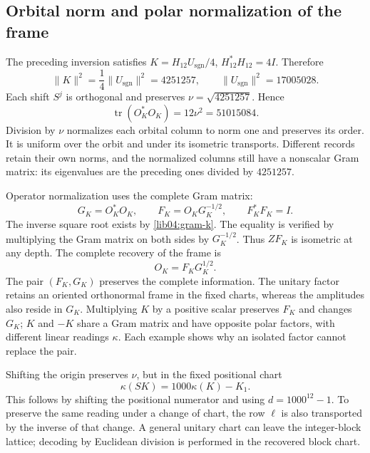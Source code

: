 \subsection{Orbital norm and polar normalization of the frame}
\label{lib04:normalizacion}

The preceding inversion satisfies
\(K=H_{12}U_{\mathrm{sgn}}/4\),
\(H_{12}^*H_{12}=4I\). Therefore
\begin{equation}
 \|K\|^2=\frac14\|U_{\mathrm{sgn}}\|^2=4251257,
 \qquad \|U_{\mathrm{sgn}}\|^2=17005028.
 \label{lib04:norma-k}
\end{equation}
Each shift \(S^j\) is orthogonal and preserves
\(\nu=\sqrt{4251257}\). Hence
\begin{equation}
 \operatorname{tr}(O_K^*O_K)=12\nu^2=51015084.
 \label{lib04:traza-marco}
\end{equation}
Division by \(\nu\) normalizes each orbital column to norm
one and preserves its order. It is uniform over the orbit and under its
isometric transports. Different records retain their own
norms, and the normalized columns still have a nonscalar
Gram matrix: its eigenvalues are the preceding ones divided by
\(4251257\).

Operator normalization uses the complete Gram matrix:
\begin{equation}
 G_K=O_K^*O_K,\qquad
 F_K=O_KG_K^{-1/2},\qquad
 F_K^*F_K=I.
 \label{lib04:polar}
\end{equation}
The inverse square root exists by \eqref{lib04:gram-k}. The equality is
verified by multiplying the Gram matrix on both sides by \(G_K^{-1/2}\).
Thus \(ZF_K\) is isometric at any depth.
The complete recovery of the frame is
\begin{equation}
 O_K=F_KG_K^{1/2}.
 \label{lib04:polar-inversa}
\end{equation}
The pair \((F_K,G_K)\) preserves the complete information.
The unitary factor retains an oriented orthonormal frame in the fixed
charts, whereas the amplitudes also reside in
\(G_K\). Multiplying \(K\) by a positive scalar preserves
\(F_K\) and changes \(G_K\); \(K\) and \(-K\) share a
Gram matrix and have opposite polar factors, with different linear readings
\(\kappa\). Each example shows why an isolated factor cannot
replace the pair.

Shifting the origin preserves \(\nu\), but in the fixed positional
chart
\begin{equation}
 \kappa(SK)=1000\kappa(K)-K_1.
 \label{lib04:cambio-origen}
\end{equation}
This follows by shifting the positional numerator and using
\(d=1000^{12}-1\). To preserve the same reading under a change
of chart, the row \(\ell\) is also transported by the inverse
of that change. A general unitary chart can leave the integer-block
lattice; decoding by Euclidean division is performed
in the recovered block chart.

